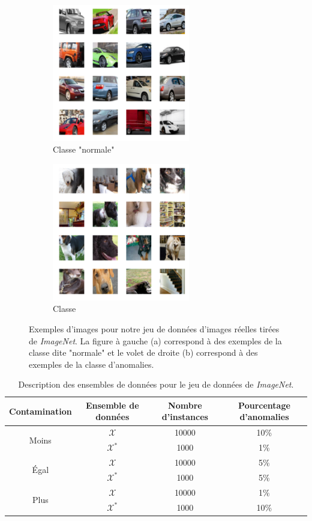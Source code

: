 \begin{figure}[htb]
	\centering
	\begin{subfigure}{6cm}
		\centering\includegraphics[width=6cm]{images/imagenet-inliers}
		\caption{Classe "normale"}
	\end{subfigure}
	\begin{subfigure}{6cm}
		\centering\includegraphics[width=6cm]{images/imagenet-outliers}
		\caption{Classe \DIFdelbeginFL {}\DIFdelendFL \DIFaddbeginFL {}\DIFaddendFL }
	\end{subfigure}
	\caption{Exemples d'images pour notre jeu de données d'images réelles tirées de \textit{ImageNet}. La figure à gauche (a) correspond à des exemples de la classe dite "normale" et le volet de droite (b) correspond à des exemples de la classe d'anomalies.}
	\label{fig:imagenet}
\end{figure}

\begin{table}[h]
	\centering
	\caption{Description des \DIFdelbeginFL {}\DIFdelendFL \DIFaddbeginFL {}\DIFaddendFL ensembles de données pour le jeu de données de \textit{ImageNet}.}
	\begin{tabular}{| c | c | c | c |}
		\hline
		\rowcolor{Gray}
		Contamination & Ensemble de données  & Nombre d'instances & Pourcentage d'anomalies  \\
		\hline
		\multirow{2}{*}{Moins} 
		& $\mathcal{X}$ & 10000 & 10\%  \\
		& $\mathcal{X^*}$  & 1000 & 1\%  \\ 
		\midrule
		\multirow{2}{*}{Égal} 
		& $\mathcal{X}$ & 10000 & 5\%  \\
		& $\mathcal{X^*}$  & 1000 & 5\%  \\ 
		\midrule
		\multirow{2}{*}{Plus} 
		& $\mathcal{X}$ & 10000 & 1\%  \\
		& $\mathcal{X^*}$  & 1000 & 10\%  \\ 
		\midrule
	\end{tabular}
	\label{tab:dataset1}
\end{table}

